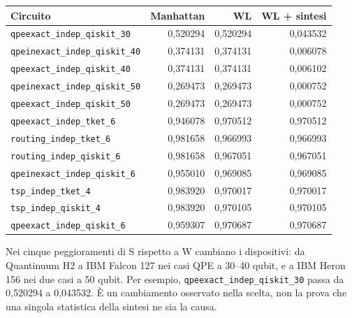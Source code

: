 \documentclass[a4paper,10pt]{article}
\begin{document}
\begin{tabularx}{\linewidth}{Xrrr}\toprule
Circuito & Manhattan & WL & WL + sintesi\\\midrule
\nolinkurl{qpeexact_indep_qiskit_30} & 0,520294 & 0,520294 & 0,043532\\
\nolinkurl{qpeinexact_indep_qiskit_40} & 0,374131 & 0,374131 & 0,006078\\
\nolinkurl{qpeexact_indep_qiskit_40} & 0,374131 & 0,374131 & 0,006102\\
\nolinkurl{qpeinexact_indep_qiskit_50} & 0,269473 & 0,269473 & 0,000752\\
\nolinkurl{qpeexact_indep_qiskit_50} & 0,269473 & 0,269473 & 0,000752\\
\nolinkurl{qpeexact_indep_tket_6} & 0,946078 & 0,970512 & 0,970512\\
\nolinkurl{routing_indep_tket_6} & 0,981658 & 0,966993 & 0,966993\\
\nolinkurl{routing_indep_qiskit_6} & 0,981658 & 0,967051 & 0,967051\\
\nolinkurl{qpeinexact_indep_qiskit_6} & 0,955010 & 0,969085 & 0,969085\\
\nolinkurl{tsp_indep_tket_4} & 0,983920 & 0,970017 & 0,970017\\
\nolinkurl{tsp_indep_qiskit_4} & 0,983920 & 0,970105 & 0,970105\\
\nolinkurl{qpeexact_indep_qiskit_6} & 0,959307 & 0,970687 & 0,970687\\
\bottomrule\end{tabularx}\endgroup\par
Nei cinque peggioramenti di S rispetto a W cambiano i dispositivi:
da Quantinuum H2 a IBM Falcon 127 nei casi QPE a 30--40 qubit,
e a IBM Heron 156 nei due casi a 50 qubit. Per esempio,
\texttt{qpeexact\_indep\_qiskit\_30} passa da 0,520294 a 0,043532.
È un cambiamento osservato nella scelta, non la prova che una singola
statistica della sintesi ne sia la causa.
\end{document}
